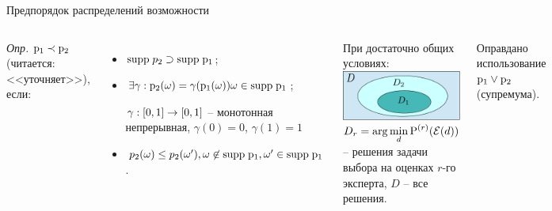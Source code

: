 \begin{frame}{Предпорядок распределений возможности}
	\begin{columns}
	    \emph{Опр.} ${\mathrm{p}}_1 \prec {\mathrm{p}}_2$ (читается: <<уточняет>>), если:
	    \begin{itemize}
		 \item ${\mathrm{supp}}\;p_2 \supset {\mathrm{supp}} \; {\mathrm{p}}_1$;

		  \item $\exists \gamma: {\mathrm{p}}_2(\omega) = \gamma({\mathrm{p}}_1(\omega))
		   \omega \in {\mathrm{supp}}\;{\mathrm{p}}_1$; \begin{center}{\footnotesize $\gamma: [0,1] \rightarrow [0,1]$ -- монотонная непрерывная, $\gamma(0)=0$, $\gamma(1)=1$} \end{center}

		  \item $p_2(\omega) \leq p_2(\omega'), \omega \not\in  {\mathrm{supp}} \; {\mathrm{p}}_1, 
		  \omega' \in  {\mathrm{supp}} \; {\mathrm{p}}_1$.
	    \end{itemize}

	    
	    \begin{center}
		При достаточно общих условиях: %
		\includegraphics[width=0.8\linewidth]{./pic/solution_sets2}
		\\ $\displaystyle D_r = \arg \min_d {\mathrm{P}}^{(r)}(\mathcal{E}(d))$ {\footnotesize -- решения задачи выбора на оценках $r$-го эксперта, $D$ -- все решения.}  
	     \end{center}
	    
	    {\small Оправдано использование ${\mathrm{p}}_1 \vee {\mathrm{p}}_2$ (супремума).} 
	    

\end{columns}
\end{frame}
